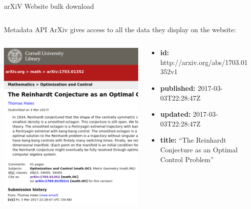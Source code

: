 \documentclass[9pt]{beamer}
\begin{document}
\begin{frame}{arXiV Website bulk download}
\begin{columns}[T]
\begin{column}{0.6\textwidth}
\begin{itemize}
            \end{itemize}
        \end{column}
    \end{columns}
\end{frame}


\begin{frame}{Metadata API}
    ArXiv gives access to all the data they display on the website:
    \begin{columns}[T]
        \begin{column}{0.4\textwidth}
    \includegraphics[width=\textwidth]{hales_article.png} 
        \end{column}
        \begin{column}{0.6\textwidth}
            \begin{itemize}
                \item \textbf{id:} http://arxiv.org/abs/1703.01352v1
                \item \textbf{published:} 2017-03-03T22:28:47Z
                \item \textbf{updated:} 2017-03-03T22:28:47Z
                \item \textbf{title:} ``The Reinhardt Conjecture as an Optimal Control Problem''

\end{itemize}
\end{column}
\end{columns}
\end{frame}
\end{document}
